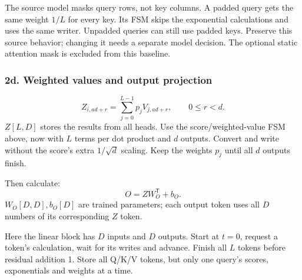 \documentclass[11pt,a4paper]{article}
\begin{document}
The source model masks query rows, not key columns. A padded query gets the same weight $1/L$ for every key. Its FSM skips the exponential calculations and uses the same writer. Unpadded queries can still use padded keys. Preserve this source behavior; changing it needs a separate model decision. The optional static attention mask is excluded from this baseline.

\subsubsection*{2d. Weighted values and output projection}
\[
Z_{i,ad+r}=\sum_{j=0}^{L-1}p_jV_{j,ad+r},\qquad 0\leq r<d.
\]
$Z[L,D]$ stores the results from all heads. Use the score/weighted-value FSM above, now with $L$ terms per dot product and $d$ outputs. Convert and write without the score's extra $1/\sqrt d$ scaling. Keep the weights $p_j$ until all $d$ outputs finish.

Then calculate:
\[
O=ZW_O^{\mathsf T}+b_O.
\]
$W_O[D,D],b_O[D]$ are trained parameters; each output token uses all $D$ numbers of its corresponding $Z$ token.
\begin{center}
\end{center}
Here the linear block has $D$ inputs and $D$ outputs. Start at $t=0$, request a token's calculation, wait for its writes and advance. Finish all $L$ tokens before residual addition 1. Store all Q/K/V tokens, but only one query's scores, exponentials and weights at a time.
\end{document}
